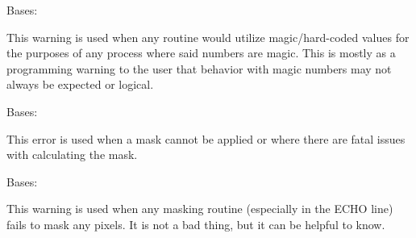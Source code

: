 \documentclass[letterpaper,10pt,english]{sphinxmanual}
\begin{document}

\begin{fulllineitems}
\label{\detokenize{python_docstrings/IfA_Smeargle.meta.errors:IfA_Smeargle.meta.errors.MagicWarning}}
Bases: {\hyperref[\detokenize{python_docstrings/IfA_Smeargle.meta.errors:IfA_Smeargle.meta.errors.Smeargle_Warning}]{}}

This warning is used when any routine would utilize magic/hard-coded
values for the purposes of any process where said numbers are magic. This
is mostly as a programming warning to the user that behavior with magic
numbers may not always be expected or logical.

\end{fulllineitems}


\begin{fulllineitems}
\label{\detokenize{python_docstrings/IfA_Smeargle.meta.errors:IfA_Smeargle.meta.errors.MaskingError}}
Bases: {\hyperref[\detokenize{python_docstrings/IfA_Smeargle.meta.errors:IfA_Smeargle.meta.errors.Smeargle_Exception}]{}}

This error is used when a mask cannot be applied or where there are
fatal issues with calculating the mask.

\end{fulllineitems}


\begin{fulllineitems}
\label{\detokenize{python_docstrings/IfA_Smeargle.meta.errors:IfA_Smeargle.meta.errors.MaskingWarning}}
Bases: {\hyperref[\detokenize{python_docstrings/IfA_Smeargle.meta.errors:IfA_Smeargle.meta.errors.Smeargle_Warning}]{}}

This warning is used when any masking routine (especially in the ECHO
line) fails to mask any pixels. It is not a bad thing, but it can be
helpful to know.

\end{fulllineitems}
\end{document}
